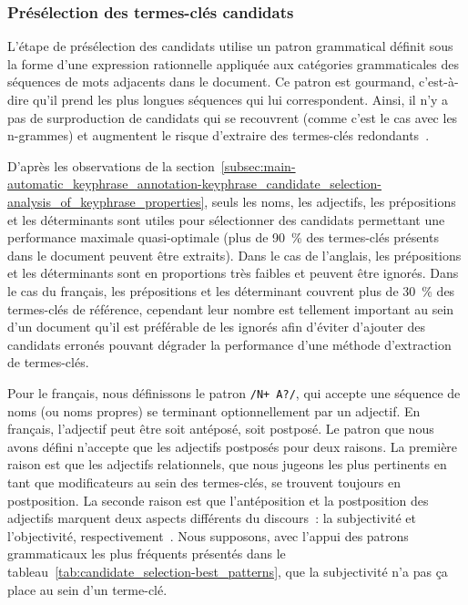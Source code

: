       \subsubsection{Présélection des termes-clés candidats}
      \label{subsubsec:main-automatic_keyphrase_annotation-keyphrase_candidate_selection-modifiers_filtering-candidate_pre_selection}
        L'étape de présélection des candidats utilise un patron grammatical
        définit sous la forme d'une expression rationnelle appliquée aux
        catégories grammaticales des séquences de mots adjacents dans le
        document. Ce patron est gourmand, c'est-à-dire qu'il prend les plus
        longues séquences qui lui correspondent. Ainsi, il n'y a pas de
        surproduction de candidats qui se recouvrent (comme c'est le cas avec
        les n-grammes) et augmentent le risque d'extraire des termes-clés
        redondants~\cite{hasan2014state_of_the_art}.

        D'après les observations de la
        section~\ref{subsec:main-automatic_keyphrase_annotation-keyphrase_candidate_selection-analysis_of_keyphrase_properties},
        seuls les noms, les adjectifs, les prépositions et les déterminants sont
        utiles pour sélectionner des candidats permettant une performance
        maximale quasi-optimale (plus de 90~\% des termes-clés présents dans le
        document peuvent être extraits). Dans le cas de l'anglais, les
        prépositions et les déterminants sont en proportions très faibles et
        peuvent être ignorés. Dans le cas du français, les prépositions et les
        déterminant couvrent plus de 30~\% des termes-clés de référence,
        cependant leur nombre est tellement important au sein d'un document
        qu'il est préférable de les ignorés afin d'éviter d'ajouter des
        candidats erronés pouvant dégrader la performance d'une méthode
        d'extraction de termes-clés.
        
        Pour le français, nous définissons le patron \texttt{/N+ A?/}, qui
        accepte une séquence de noms (ou noms propres) se terminant
        optionnellement par un adjectif. En français, l'adjectif peut être soit
        antéposé, soit postposé. Le patron que nous avons défini n'accepte que
        les adjectifs postposés pour deux raisons. La première raison est que
        les adjectifs relationnels, que nous jugeons les plus pertinents en tant
        que modificateurs au sein des termes-clés, se trouvent toujours en
        postposition. La seconde raison est que l'antéposition et la
        postposition des adjectifs marquent deux aspects différents du
        discours~: la subjectivité et l'objectivité,
        respectivement~\cite{eskenazi2005adjectifavantapres}. Nous supposons,
        avec l'appui des patrons grammaticaux les plus fréquents présentés dans
        le tableau~\ref{tab:candidate_selection-best_patterns}, que la
        subjectivité n'a pas ça place au sein d'un terme-clé.
        
